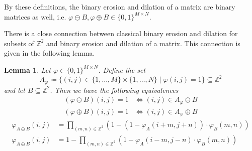 \documentclass[a4paper,12pt]{article}
\theoremstyle{plain}
\newtheorem{lemma}[theorem]{Lemma}
\theoremstyle{definition}
\theoremstyle{remark}
\begin{document}
By these definitions, the binary erosion and dilation of a matrix are binary matrices as well, i.e. $\varphi \ominus B, \varphi \oplus B \in \{ 0, 1 \}^{M \times N}$.

There is a close connection between classical binary erosion and dilation for subsets of $\mathbb{Z}^2$ and binary erosion and dilation of a matrix. This connection is given in the following lemma.

\begin{lemma}\label{lemerodil}
	Let $\varphi \in \{ 0, 1 \}^{M \times N}$. Define the set
	\begin{equation*}
		A_\varphi \coloneqq \{ (i, j) \in \{ 1, \dots, M \} \times \{ 1, \dots, N \} \mid \varphi(i, j) = 1 \} \subseteq \mathbb{Z}^2
	\end{equation*}
	and let $B \subseteq \mathbb{Z}^2$. Then we have the following equivalences
	\begin{align}
		(\varphi \ominus B)(i, j) = 1 &\Leftrightarrow (i, j) \in A_\varphi \ominus B \label{eqero} \\
		(\varphi \oplus B)(i, j) = 1 &\Leftrightarrow (i, j) \in A_\varphi \oplus B \label{eqdil}
	\end{align}
	\begin{align}
		\varphi_{A \ominus B}(i, j) &= \prod_{(m, n) \in \mathbb{Z}^2} ( 1 - ( 1 - \varphi_A(i + m, j + n) ) \cdot \varphi_B(m, n) ) \label{eqero2} \\
		\varphi_{A \oplus B}(i, j) &= 1 - \prod_{(m, n) \in \mathbb{Z}^2} ( 1 - \varphi_A(i - m, j - n) \cdot \varphi_B(m, n) ) \label{eqdil2}
	\end{align}
\end{lemma}
\end{document}
